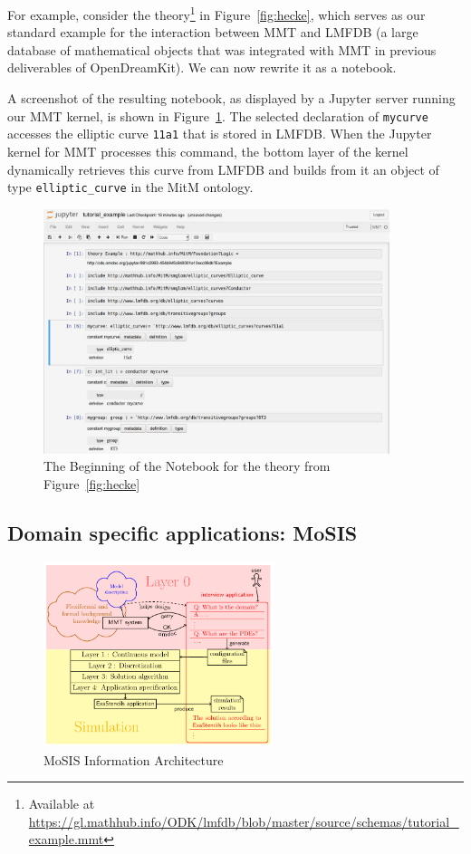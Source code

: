 For example, consider the theory\footnote{Available at \url{https://gl.mathhub.info/ODK/lmfdb/blob/master/source/schemas/tutorial_example.mmt}}  in Figure~\ref{fig:hecke}, which serves as our standard example for the interaction between MMT and LMFDB (a large database of mathematical objects that was integrated with MMT in previous deliverables of OpenDreamKit).
We can now rewrite it as a notebook.

A screenshot of the resulting notebook, as displayed by a Jupyter server running our MMT kernel, is shown in Figure~\ref{fig:lmfdbexample}.
The selected declaration of \texttt{mycurve} accesses the elliptic curve \texttt{11a1} that is stored in LMFDB.
When the Jupyter kernel for MMT processes this command, the bottom layer of the kernel dynamically retrieves this curve from LMFDB and builds from it an object of type \texttt{elliptic\_curve} in the MitM ontology.

\begin{figure}[ht]\centering
  \includegraphics[width=0.9\textwidth]{../D4.11/lmfdb_example}
  \caption{The Beginning of the Notebook for the theory from Figure~\ref{fig:hecke}}\label{fig:lmfdbexample}
\end{figure}

\subsection{Domain specific applications: MoSIS}

\begin{figure}[ht]\centering
  \includegraphics[width=0.6\textwidth]{../D4.11/proto}
  \caption{MoSIS Information Architecture}\label{fig:prototype}
\end{figure}

